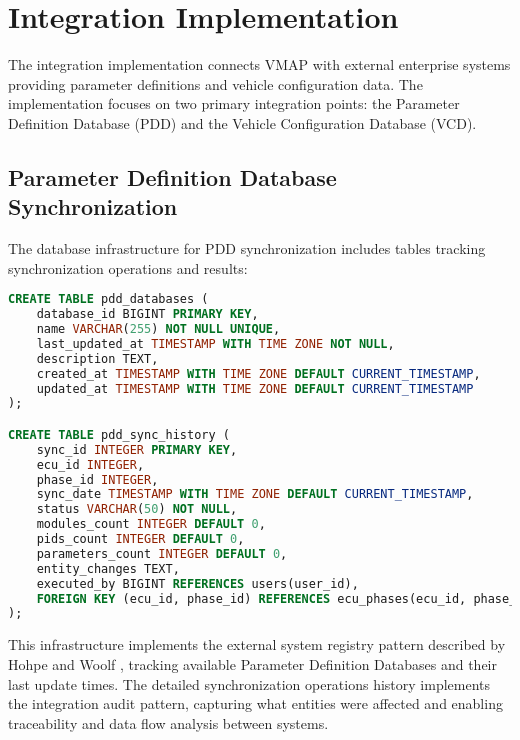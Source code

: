 \section{Integration Implementation}
\label{sec:integration-implementation}

The integration implementation connects VMAP with external enterprise systems providing parameter definitions and vehicle configuration data. The implementation focuses on two primary integration points: the Parameter Definition Database (PDD) and the Vehicle Configuration Database (VCD).

\subsection{Parameter Definition Database Synchronization}
\label{subsec:pdd-synchronization-process}

The database infrastructure for PDD synchronization includes tables tracking synchronization operations and results:

\begin{lstlisting}[language=SQL, caption={Parameter Definition Database Synchronization Infrastructure}, label={lst:pdd-sync-infrastructure}]
CREATE TABLE pdd_databases (
    database_id BIGINT PRIMARY KEY,
    name VARCHAR(255) NOT NULL UNIQUE,
    last_updated_at TIMESTAMP WITH TIME ZONE NOT NULL,
    description TEXT,
    created_at TIMESTAMP WITH TIME ZONE DEFAULT CURRENT_TIMESTAMP,
    updated_at TIMESTAMP WITH TIME ZONE DEFAULT CURRENT_TIMESTAMP
);

CREATE TABLE pdd_sync_history (
    sync_id INTEGER PRIMARY KEY,
    ecu_id INTEGER,
    phase_id INTEGER,
    sync_date TIMESTAMP WITH TIME ZONE DEFAULT CURRENT_TIMESTAMP,
    status VARCHAR(50) NOT NULL,
    modules_count INTEGER DEFAULT 0,
    pids_count INTEGER DEFAULT 0,
    parameters_count INTEGER DEFAULT 0,
    entity_changes TEXT,
    executed_by BIGINT REFERENCES users(user_id),
    FOREIGN KEY (ecu_id, phase_id) REFERENCES ecu_phases(ecu_id, phase_id)
);
\end{lstlisting}

This infrastructure implements the external system registry pattern described by Hohpe and Woolf \cite{hohpe2002enterprise}, tracking available Parameter Definition Databases and their last update times. The detailed synchronization operations history implements the integration audit pattern, capturing what entities were affected and enabling traceability and data flow analysis between systems.

